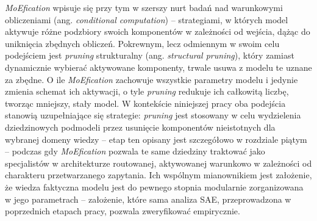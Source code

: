 \textit{MoEfication} wpisuje się przy tym w szerszy nurt badań nad warunkowymi obliczeniami (ang. \textit{conditional computation}) -- strategiami, w których model aktywuje różne podzbiory swoich komponentów w zależności od wejścia, dążąc do uniknięcia zbędnych obliczeń. Pokrewnym, lecz odmiennym w swoim celu podejściem jest \textit{pruning} strukturalny (ang. \textit{structural pruning}), który zamiast dynamicznie wybierać aktywowane komponenty, trwale usuwa z modelu te uznane za zbędne. O ile \textit{MoEfication} zachowuje wszystkie parametry modelu i jedynie zmienia schemat ich aktywacji, o tyle \textit{pruning} redukuje ich całkowitą liczbę, tworząc mniejszy, stały model. W kontekście niniejszej pracy oba podejścia stanowią uzupełniające się strategie: \textit{pruning} jest stosowany w celu wydzielenia dziedzinowych podmodeli przez usunięcie komponentów nieistotnych dla wybranej domeny wiedzy -- etap ten opisany jest szczegółowo w rozdziale piątym -- podczas gdy \textit{MoEfication} pozwala te same dziedziny traktować jako specjalistów w architekturze routowanej, aktywowanej warunkowo w zależności od charakteru przetwarzanego zapytania. Ich wspólnym mianownikiem jest założenie, że wiedza faktyczna modelu jest do pewnego stopnia modularnie zorganizowana w jego parametrach -- założenie, które sama analiza SAE, przeprowadzona w poprzednich etapach pracy, pozwala zweryfikować empirycznie.

